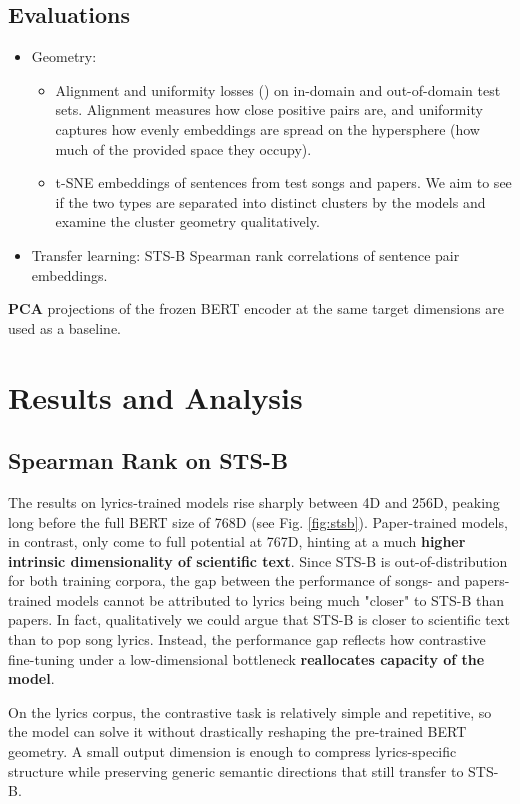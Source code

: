 \documentclass{article}
\begin{document}
\subsection{Evaluations}

\begin{itemize}
\item Geometry:
\begin{itemize}
\item Alignment and uniformity losses (\cite{wang2020contrastive}) on in-domain
and out-of-domain test sets. Alignment measures how close positive pairs are, and
uniformity captures how evenly embeddings are spread on the hypersphere (how much of the provided space they occupy).
\item t-SNE embeddings of sentences from test songs and papers. We aim to see if the two types are separated
into distinct clusters by the models and examine the cluster geometry qualitatively.
\end{itemize}
\item Transfer learning: STS-B Spearman rank correlations of sentence pair embeddings.
\end{itemize}

\textbf{PCA} projections of the frozen BERT encoder at the same target dimensions are
used as a baseline.

\section{Results and Analysis}

\subsection{Spearman Rank on STS-B}
The results on lyrics-trained models rise sharply between 4D and 256D, peaking long
before the full BERT size of 768D (see Fig. \ref{fig:stsb}). Paper-trained models, in
contrast, only come to full potential at 767D, hinting at a much \textbf{higher intrinsic
dimensionality of scientific text}. Since STS-B is out-of-distribution for both training
corpora, the gap between the performance of songs- and papers-trained models cannot be
attributed to lyrics being much "closer" to STS-B than papers. In fact, qualitatively we could argue that
STS-B is closer to scientific text than to pop song lyrics. Instead, the performance gap reflects how
contrastive fine-tuning under a low-dimensional bottleneck \textbf{reallocates capacity
of the model}.

On the lyrics corpus, the contrastive task is relatively simple and repetitive, so the
model can solve it without drastically reshaping the pre-trained BERT geometry. A small
output dimension is enough to compress lyrics-specific structure while preserving generic
semantic directions that still transfer to STS-B.
\end{document}
